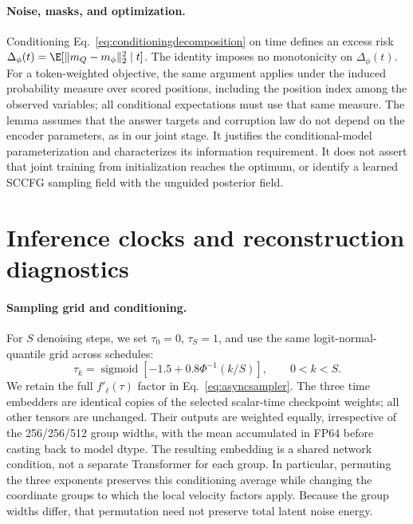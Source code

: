 \paragraph{Noise, masks, and optimization.}
Conditioning Eq.~\eqref{eq:conditioningdecomposition} on time defines an excess risk $\Delta_\phi(t)=\E[\|m_Q-m_\phi\|_2^2\mid t]$. The identity imposes no monotonicity on $\Delta_\phi(t)$. For a token-weighted objective, the same argument applies under the induced probability measure over scored positions, including the position index among the observed variables; all conditional expectations must use that same measure. The lemma assumes that the answer targets and corruption law do not depend on the encoder parameters, as in our joint stage. It justifies the conditional-model parameterization and characterizes its information requirement. It does not assert that joint training from initialization reaches the optimum, or identify a learned SCCFG sampling field with the unguided posterior field.

\section{Inference clocks and reconstruction diagnostics}
\label{app:inferenceclocks}

\paragraph{Sampling grid and conditioning.}
For $S$ denoising steps, we set $\tau_0=0$, $\tau_S=1$, and use the same logit-normal-quantile grid across schedules:
\begin{equation}
 \tau_k=\operatorname{sigmoid}\!\left[-1.5+0.8\Phi^{-1}(k/S)\right],
 \qquad 0<k<S.
\end{equation}
We retain the full $f'_\ell(\tau)$ factor in Eq.~\eqref{eq:asyncsampler}. The three time embedders are identical copies of the selected scalar-time checkpoint weights; all other tensors are unchanged. Their outputs are weighted equally, irrespective of the 256/256/512 group widths, with the mean accumulated in FP64 before casting back to model dtype. The resulting embedding is a shared network condition, not a separate Transformer for each group. In particular, permuting the three exponents preserves this conditioning average while changing the coordinate groups to which the local velocity factors apply. Because the group widths differ, that permutation need not preserve total latent noise energy.

